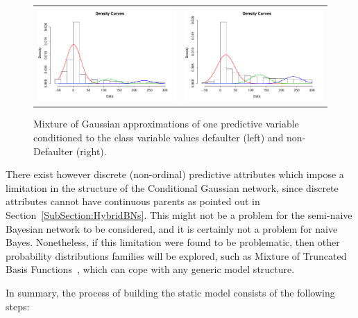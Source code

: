 \begin{figure}[htbp]
  \centering
    \begin{tabular}{cc}
    \includegraphics[width=70mm]{figures/CajaMarmixtureBalanceDef}&
    \includegraphics[width=70mm]{figures/CajaMarmixtureBalanceNonDef}\\
  \end{tabular}
    \caption{\label{Figure:cajamarMixt}Mixture of Gaussian approximations of one predictive variable conditioned to the class variable values defaulter (left) and non-Defaulter (right).}
\end{figure}

There exist however discrete (non-ordinal) predictive attributes which impose a limitation in the structure of the Conditional Gaussian network, since discrete attributes cannot have continuous parents as pointed out in Section~\ref{SubSection:HybridBNs}. This might not be a problem for the semi-naive Bayesian network to be considered, and it is certainly not a problem for naive Bayes. Nonetheless, if this limitation were found to be problematic, then other probability distributions families will be explored, such as Mixture of Truncated Basis Functions~\cite{Lan12}, which can cope with any generic model structure. 

In summary, the process of building the static model consists of the following steps:

